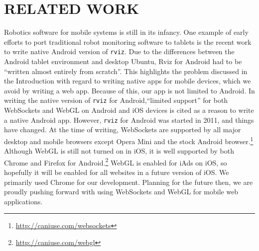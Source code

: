 \documentclass[letterpaper, 10 pt, conference]{ieee/ieeeconf}  %
\begin{document}




\section{RELATED WORK}
Robotics software for mobile systems is still in its infancy.
One example of early efforts to port traditional robot monitoring software to tablets is the recent work to write native Android version of \texttt{rviz}.
Due to the differences between the Android tablet environment and desktop Ubuntu, Rviz for Android had to be ``written almost entirely from scratch''. \cite{rviz_android}
This highlights the problem discussed in the Introduction with regard to writing native apps for mobile devices, which we avoid by writing a web app.
Because of this, our app is not limited to Android.
In writing the native version of \texttt{rviz} for Android,``limited support'' for both WebSockets and WebGL on Android and iOS devices is cited as a reason to write a native Android app.
However, \texttt{rviz} for Android was started in 2011, and things have changed.
At the time of writing, WebSockets are supported by all major desktop and mobile browsers except Opera Mini and the stock Android browser.\footnote{\url{http://caniuse.com/websockets}}
Although WebGL is still not turned on in iOS, it is well supported by both Chrome and Firefox for Android.\footnote{\url{http://caniuse.com/webgl}}
WebGL is enabled for iAds on iOS, so hopefully it will be enabled for all websites in a future version of iOS. \cite{iAd}
We primarily used Chrome for our development.
Planning for the future then, we are proudly pushing forward with using WebSockets and WebGL for mobile web applications.
\end{document}
